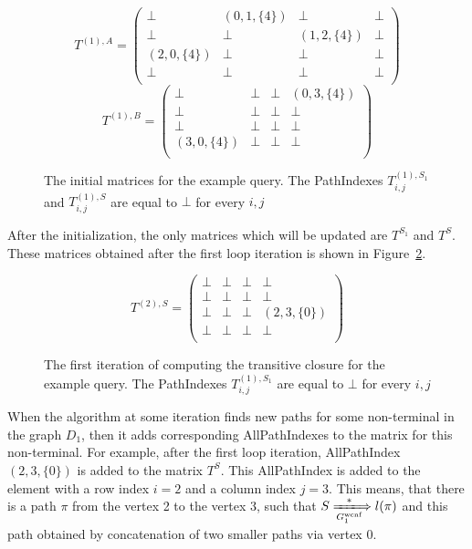 {\small
	\begin{figure}[h]
		\[
		T^{(1),A} = \begin{pmatrix}
			\bot & (0,1,\{4\})       & \bot & \bot       \\
			\bot & \bot & (1,2,\{4\})       & \bot \\
			(2,0,\{4\})       & \bot & \bot & \bot \\
			\bot       & \bot & \bot & \bot \\
		\end{pmatrix}
		\]
		\[
		T^{(1),B} = \begin{pmatrix}
			\bot & \bot       & \bot & (0,3,\{4\})       \\
			\bot & \bot & \bot       & \bot \\
			\bot       & \bot & \bot & \bot \\
			(3,0,\{4\})      & \bot & \bot & \bot \\
		\end{pmatrix}
		\]
		\caption{The initial matrices for the example query. The PathIndexes $T^{(1),S_1}_{i,j}$ and $T^{(1),S}_{i,j}$ are equal to $\bot$ for every $i,j$}
		\label{ExampleQueryInitMatrix}
	\end{figure}
}

After the initialization, the only matrices which will be updated are $T^{S_1}$ and $T^{S}$. These matrices obtained after the first loop iteration is shown in Figure~\ref{ExampleQueryFirstIteration}.

{\small
	\begin{figure}[h]
		\[
		T^{(2),S} = \begin{pmatrix}
			\bot & \bot       & \bot & \bot       \\
			\bot & \bot & \bot       & \bot \\
			\bot       & \bot & \bot & (2,3,\{0\}) \\
			\bot       & \bot & \bot & \bot \\
		\end{pmatrix}
		\]
		\caption{The first iteration of computing the transitive closure for the example query. The PathIndexes $T^{(1),S_1}_{i,j}$ are equal to $\bot$ for every $i,j$}
		\label{ExampleQueryFirstIteration}
	\end{figure}
}

When the algorithm at some iteration finds new paths for some non-terminal in the graph $D_1$, then it adds corresponding AllPathIndexes to the matrix for this non-terminal. For example, after the first loop iteration, AllPathIndex $(2,3,\{0\})$ is added to the matrix $T^{S}$. This AllPathIndex is added to the element with a row index $i = 2$ and a column index $j = 3$. This means, that there is a path $\pi$ from the vertex 2 to the vertex 3, such that $S \xLongrightarrow[G_1^{\text{wcnf}}]{*} l(\pi)$ and this path obtained by concatenation of two smaller paths via vertex 0.

